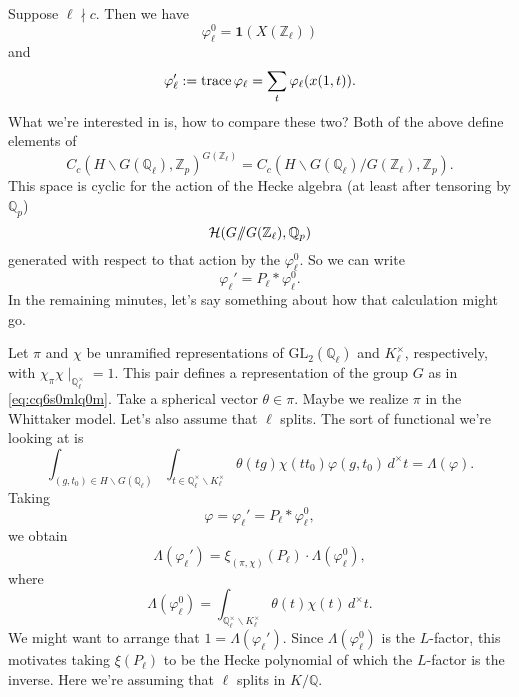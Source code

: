 \documentclass[reqno]{amsart} 
\begin{document}
Suppose $\ell \nmid c$.  Then we have
\begin{equation*}
  \varphi_{\ell}^0 = \mathbf{1}(X(\mathbb{Z}_{\ell}))
\end{equation*}
and
\begin{equation*}
  \varphi_{\ell} ' := \operatorname{trace} \varphi_{\ell} = \sum_t \varphi_{\ell}(x(1, t)).
\end{equation*}
What we're interested in is, how to compare these two?  Both of the above define elements of
\begin{equation*}
  C_c(H \backslash G(\mathbb{Q}_{\ell}), \mathbb{Z}_p)^{G(\mathbb{Z}_\ell)}
  =
  C_c(H \backslash G(\mathbb{Q}_{\ell}) / G(\mathbb{Z}_\ell), \mathbb{Z}_p).
\end{equation*}
This space is cyclic for the action of the Hecke algebra (at least after tensoring by $\mathbb{Q}_p$)
\begin{equation*}
  \mathcal{H}(G /\!\!/ G(\mathbb{Z}_{\ell}), \mathbb{Q}_p)
\end{equation*}
generated with respect to that action by the $\varphi_{\ell}^0$.  So we can write
\begin{equation*}
  \varphi_{\ell} ' = P_{\ell} \ast \varphi_{\ell}^0.
\end{equation*}
In the remaining minutes, let's say something about how that calculation might go.

Let $\pi$ and $\chi$ be unramified representations of $\mathrm{GL}_2(\mathbb{Q}_{\ell})$ and $K_{\ell}^\times$, respectively, with $\chi_\pi \chi \mid_{\mathbb{Q}_{\ell}^\times} = 1$.  This pair defines a representation of the group $G$ as in \eqref{eq:cq6s0mlq0m}.  Take a spherical vector $\theta \in \pi$.  Maybe we realize $\pi$ in the Whittaker model.  Let's also assume that $\ell$ splits.  The sort of functional we're looking at is
\begin{equation*}
  \int_{(g, t_0) \in H \backslash G(\mathbb{Q}_{\ell})}
  \int_{t \in \mathbb{Q}_{\ell}^\times \backslash K_{\ell}^\times}
  \theta(t g)
  \chi(t t_0)
  \varphi(g, t_0)
  \,d^\times t
  = \Lambda(\varphi).
\end{equation*}
Taking
\begin{equation*}
  \varphi = \varphi_{\ell} ' = P_{\ell} \ast \varphi_{\ell}^0,
\end{equation*}
we obtain
\begin{equation*}
  \Lambda(\varphi_{\ell} ') = \xi_{(\pi, \chi)}(P_{\ell}) \cdot \Lambda(\varphi_{\ell}^0),
\end{equation*}
where
\begin{equation*}
  \Lambda(\varphi_{\ell}^0) = \int_{\mathbb{Q}_{\ell}^\times \backslash K_{\ell}^\times} \theta(t) \chi(t) \,d^\times t.
\end{equation*}
We might want to arrange that $1 = \Lambda(\varphi_{\ell} ')$.  Since $\Lambda(\varphi_{\ell}^0)$ is the $L$-factor, this motivates taking $\xi(P_{\ell})$ to be the Hecke polynomial of which the $L$-factor is the inverse.  Here we're assuming that $\ell$ splits in $K / \mathbb{Q}$.
\end{document}
